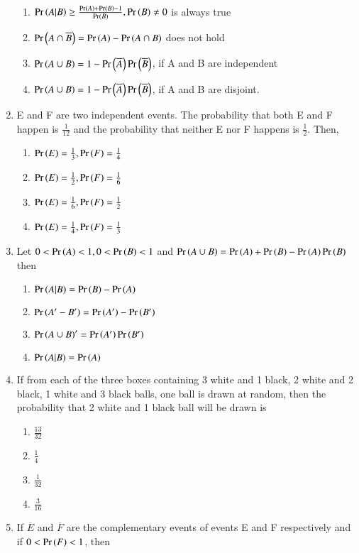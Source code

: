 \documentclass[journal,12pt,twocolumn,article]{IEEEtran}
\theoremstyle{remark}
\begin{document}
\begin{enumerate}[start = 3]
\begin{enumerate}
\item $\Pr\left(A|B\right)\geq \frac{\Pr\left(A\right)+\Pr\left(B\right)-1}{\Pr\left(B\right)}, \Pr\left(B\right)\neq 0$ is always true
\item $\Pr\left(A\cap \overline{B}\right)=\Pr\left(A\right)-\Pr\left(A\cap B\right)$ does not hold
\item $\Pr\left(A\cup B\right)=1-\Pr\left(\overline{A}\right)\Pr\left(\overline{B}\right)$, if A and B are independent
\item $\Pr\left(A\cup B\right)=1-\Pr\left(\overline{A}\right)\Pr\left(\overline{B}\right)$, if A and B are disjoint.
\end{enumerate}
\item E and F are two independent events. The probability that both E and F happen is $\frac{1}{12}$ and the probability that neither E nor F happens is $\frac{1}{2}$. Then,
\hfill{}
\begin{enumerate}
\item $\Pr\left(E\right)=\frac{1}{3},\Pr\left(F\right)=\frac{1}{4}$
\item $\Pr\left(E\right)=\frac{1}{2},\Pr\left(F\right)=\frac{1}{6}$
\item $\Pr\left(E\right)=\frac{1}{6},\Pr\left(F\right)=\frac{1}{2}$
\item $\Pr\left(E\right)=\frac{1}{4},\Pr\left(F\right)=\frac{1}{3}$
\end{enumerate}
\item Let $0<\Pr\left(A\right)<1,0<\Pr\left(B\right)<1$ and $\Pr\left(A\cup B\right)=\Pr\left(A\right)+\Pr\left(B\right)-\Pr\left(A\right)\Pr\left(B\right)$ then
\hfill{}
\begin{enumerate}
\item $\Pr\left(A|B\right)=\Pr\left(B\right)-\Pr\left(A\right)$
\item $\Pr\left(A'-B'\right)=\Pr\left(A'\right)-\Pr\left(B'\right)$
\item $\Pr\left(A\cup B\right)'=\Pr\left(A'\right)\Pr\left(B'\right)$
\item $\Pr\left(A|B\right)=\Pr\left(A\right)$
\end{enumerate}
\item If from each of the three boxes containing 3 white and 1 black, 2 white and 2 black, 1 white and 3 black balls, one ball is drawn at random, then the probability that 2 white and 1 black ball will be drawn is
\hfill{}
\begin{enumerate}
\item $\frac{13}{32}$
\item $\frac{1}{4}$
\item $\frac{1}{32}$
\item $\frac{3}{16}$
\end{enumerate}
\item If $\overline{E}$ and $\overline{F}$ are the complementary events of events E and F respectively and if $0<\Pr\left(F\right)<1$, then

\end{enumerate}
\end{document}
